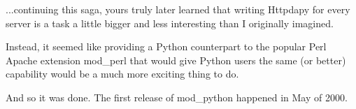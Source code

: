 ...continuing this saga, yours truly later learned that writing Httpdapy for
every server is a task a little bigger and less interesting than I
originally imagined.

Instead, it seemed like providing a Python counterpart to the popular
Perl Apache extension mod_perl that would give Python users the same
(or better) capability would be a much more exciting thing to do.

And so it was done. The first release of mod_python happened in May of
2000.

